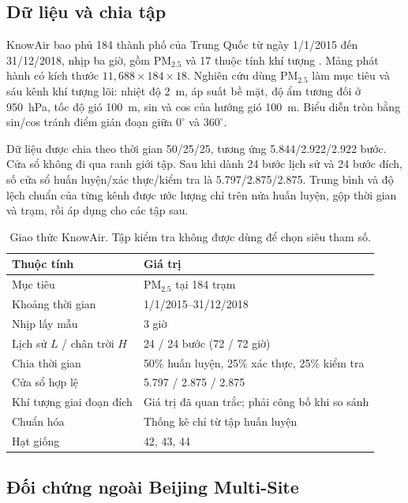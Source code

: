 \documentclass[10pt,a4paper]{article}
\newcommand{\pmfine}{PM$_{2.5}$}
\begin{document}
\subsection{Dữ liệu và chia tập}

KnowAir bao phủ 184 thành phố của Trung Quốc từ ngày 1/1/2015 đến 31/12/2018, nhịp ba giờ, gồm \pmfine{} và 17 thuộc tính khí tượng \citep{wang2020pm25gnn}. Mảng phát hành có kích thước $11{,}688\times184\times18$. Nghiên cứu dùng \pmfine{} làm mục tiêu và sáu kênh khí tượng lõi: nhiệt độ 2~m, áp suất bề mặt, độ ẩm tương đối ở 950~hPa, tốc độ gió 100~m, sin và cos của hướng gió 100~m. Biểu diễn tròn bằng sin/cos tránh điểm gián đoạn giữa $0^{\circ}$ và $360^{\circ}$.

Dữ liệu được chia theo thời gian 50/25/25, tương ứng 5.844/2.922/2.922 bước. Cửa sổ không đi qua ranh giới tập. Sau khi dành 24 bước lịch sử và 24 bước đích, số cửa sổ huấn luyện/xác thực/kiểm tra là 5.797/2.875/2.875. Trung bình và độ lệch chuẩn của từng kênh được ước lượng chỉ trên nửa huấn luyện, gộp thời gian và trạm, rồi áp dụng cho các tập sau.

\begin{table}[t]
  \centering
  \caption{Giao thức KnowAir. Tập kiểm tra không được dùng để chọn siêu tham số.}
  \label{tab:protocol}
  \begin{threeparttable}
  \begin{tabular}{@{}ll@{}}
    \toprule
    Thuộc tính & Giá trị \\
    \midrule
    Mục tiêu & \pmfine{} tại 184 trạm \\
    Khoảng thời gian & 1/1/2015--31/12/2018 \\
    Nhịp lấy mẫu & 3 giờ \\
    Lịch sử $L$ / chân trời $H$ & 24 / 24 bước (72 / 72 giờ) \\
    Chia thời gian & 50\% huấn luyện, 25\% xác thực, 25\% kiểm tra \\
    Cửa sổ hợp lệ & 5.797 / 2.875 / 2.875 \\
    Khí tượng giai đoạn đích & Giá trị đã quan trắc; phải công bố khi so sánh \\
    Chuẩn hóa & Thống kê chỉ từ tập huấn luyện \\
    Hạt giống & 42, 43, 44 \\
    \bottomrule
  \end{tabular}
  \end{threeparttable}
\end{table}

\subsection{Đối chứng ngoài Beijing Multi-Site}
\end{document}
